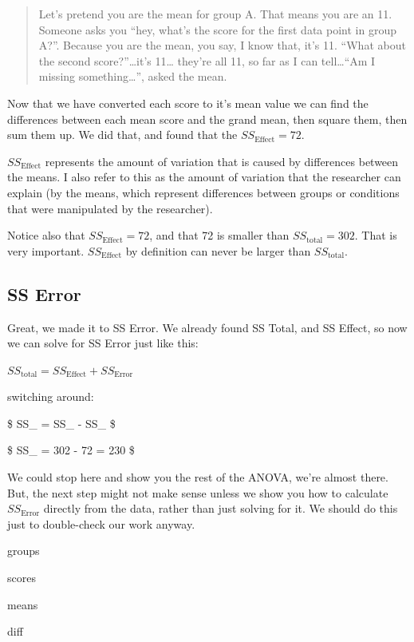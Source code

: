 \documentclass[
]{book}
\begin{document}
\begin{quote}
Let's pretend you are the mean for group A. That means you are an 11. Someone asks you ``hey, what's the score for the first data point in group A?''. Because you are the mean, you say, I know that, it's 11. ``What about the second score?''\ldots it's 11\ldots{} they're all 11, so far as I can tell\ldots{}``Am I missing something\ldots{}'', asked the mean.
\end{quote}

Now that we have converted each score to it's mean value we can find the differences between each mean score and the grand mean, then square them, then sum them up. We did that, and found that the \(SS_\text{Effect} = 72\).

\(SS_\text{Effect}\) represents the amount of variation that is caused by differences between the means. I also refer to this as the amount of variation that the researcher can explain (by the means, which represent differences between groups or conditions that were manipulated by the researcher).

Notice also that \(SS_\text{Effect} = 72\), and that 72 is smaller than \(SS_\text{total} = 302\). That is very important. \(SS_\text{Effect}\) by definition can never be larger than \(SS_\text{total}\).

\hypertarget{ss-error}{%
\subsection{SS Error}\label{ss-error}}

Great, we made it to SS Error. We already found SS Total, and SS Effect, so now we can solve for SS Error just like this:

\(SS_\text{total} = SS_\text{Effect} + SS_\text{Error}\)

switching around:

\$ SS\_ = SS\_ - SS\_ \$

\$ SS\_ = 302 - 72 = 230 \$

We could stop here and show you the rest of the ANOVA, we're almost there. But, the next step might not make sense unless we show you how to calculate \(SS_\text{Error}\) directly from the data, rather than just solving for it. We should do this just to double-check our work anyway.

groups

scores

means

diff
\end{document}
